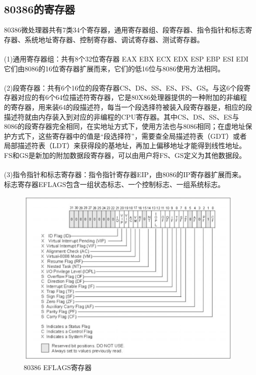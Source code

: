 \documentclass[12pt]{article}
\begin{document}
\subsection{80386的寄存器}
80386微处理器共有7类34个寄存器，通用寄存器组、段寄存器、指令指针和标志寄存器、系统地址寄存器、控制寄存器、调试寄存器、测试寄存器。\\\\
(1)通用寄存器组：共有8个32位寄存器 EAX EBX ECX EDX ESP EBP ESI EDI 它们由8086的16位寄存器扩展而来，它们的低16位与8086使用方法相同。\\\\
(2)段寄存器：共有6个16位的段寄存器CS、DS、SS、ES、FS、GS。与这6个段寄存器对应的有6个64位描述符寄存器，它是80X86处理器提供的一种附加的非编程的寄存器，用来装64的段描述符，每当一个段选择符被装入段寄存器是，相应的段描述符就由内存装入到对应的非编程的CPU寄存器。其中CS、DS、SS、ES与8086的段寄存器完全相同，在实地址方式下，使用方法也与8086相同；在虚地址保护方式下，这些寄存器中的值是“段选择符”，需要查全局描述符表（GDT）或者局部描述符表（LDT）来获得段的基地址，再加上偏移地址才能得到线性地址。 FS和GS是新加的附加数据段寄存器，可以由用户将FS、GS定义为其他数据段。\\\\
(3)指令指针和标志寄存器：指令指针寄存器EIP，由8086的IP寄存器扩展而来。标志寄存器EFLAGS包含一组状态标志、一个控制标志、一组系统标志。
\begin{figure}[htbp]
\centering
\includegraphics[scale=0.5]{fig/23.png}
\caption{80386 EFLAGS寄存器}
\label{fig:80386 EFLAGS}
\end{figure}
\end{document}
